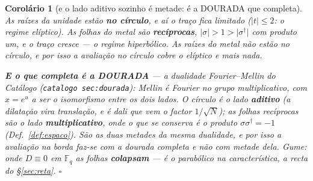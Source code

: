 \documentclass[11pt,a4paper]{article}
\newtheorem{corolario}[teorema]{Corolário}
\newcommand{\code}[1]{\texttt{\small #1}}
\newcommand{\abs}[1]{\lvert #1\rvert}
\newcommand{\dg}{^{\dagger}}
\begin{document}
\begin{corolario}[e o lado aditivo sozinho é metade: é a DOURADA que
completa]\label{cor:dourada-completa}
As raízes da unidade estão \textbf{no círculo}, e aí o traço fica \emph{limitado}
($\abs{t}\leq2$: o regime elíptico). As folhas do metal são \textbf{recíprocas},
$\abs{\sigma}>1>\abs{\sigma\dg}$ com produto um, e o traço \emph{cresce} --- o
regime hiperbólico. \emph{As raízes do metal não estão no círculo}, e por isso a
avaliação no círculo cobre o elíptico e mais nada.

\textbf{E o que completa é a DOURADA} --- a dualidade Fourier--Mellin do
\emph{Catálogo} (\code{catalogo sec:dourada}): \emph{Mellin é Fourier no grupo multiplicativo}, com
$x=e^{u}$ a ser o isomorfismo entre os dois lados. O círculo é o lado \textbf{aditivo}
(a dilatação vira translação, e é dali que vem o factor $1/\sqrt N$); as folhas recíprocas
são o lado \textbf{multiplicativo}, onde o que se conserva é o \emph{produto}
$\sigma\sigma\dg=-1$ (Def.~\ref{def:espaco}). \emph{São as duas metades da mesma
dualidade}, e por isso a avaliação na borda faz-se com a dourada completa e não com metade
dela. \emph{Gume}: onde $D\equiv0$
em $\mathbb{F}_q$ as folhas \textbf{colapsam} --- é o parabólico na
característica, a recta do \S\ref{sec:reta}. $\square$
\end{corolario}
\end{document}

